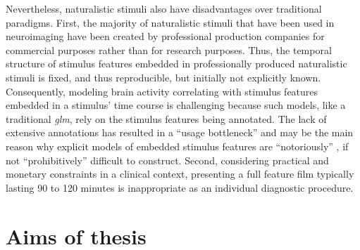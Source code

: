 Nevertheless, naturalistic stimuli also have disadvantages over traditional
paradigms.
First, the majority of naturalistic stimuli that have been used in neuroimaging
have been created by professional production companies for commercial purposes
rather than for research purposes.
Thus, the temporal structure of stimulus features embedded in professionally
produced naturalistic stimuli is fixed, and thus reproducible, but initially not
explicitly known.
Consequently, modeling brain activity correlating with stimulus features
embedded in a stimulus' time course is challenging
\citep{saarimaki2021naturalistic, simony2020analysis} because such models, like
a traditional \textit{\ac{glm}}, rely on the stimulus features being annotated.
The lack of extensive annotations has resulted in a ``usage bottleneck''
\citep[][p.  16]{aliko2020naturalistic} and may be the main reason why explicit
models of embedded stimulus features are ``notoriously'' \citep[][p.
1]{richard2019fast}, if not ``prohibitively'' \citep[p.
676]{nastase2019measuring} difficult to construct.
Second, considering practical and monetary constraints in a clinical context,
presenting a full feature film typically lasting 90 to 120 minutes is
inappropriate as an individual diagnostic procedure.

\section{Aims of thesis}





